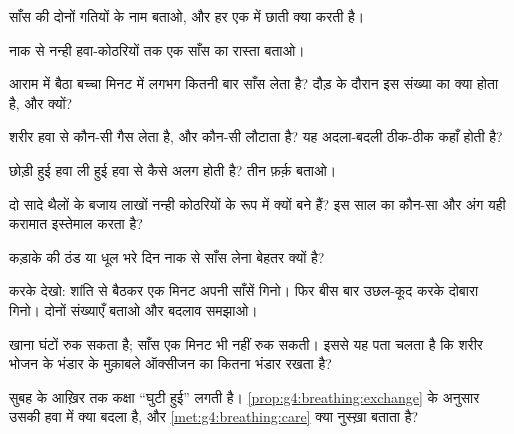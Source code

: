 \begin{exercise}[$\star$]\label{exo:g4:breathing:1}
साँस की दोनों गतियों के नाम बताओ, और हर एक में छाती क्या करती है।
\end{exercise}

\begin{exercise}[$\star$]\label{exo:g4:breathing:2}
नाक से नन्ही हवा-कोठरियों तक एक साँस का रास्ता बताओ।
\end{exercise}

\begin{exercise}[$\star$]\label{exo:g4:breathing:3}
आराम में बैठा बच्चा मिनट में लगभग कितनी बार साँस लेता है? दौड़ के दौरान
इस संख्या का क्या होता है, और क्यों?
\end{exercise}

\begin{exercise}[$\star$]\label{exo:g4:breathing:4}
शरीर हवा से कौन-सी गैस लेता है, और कौन-सी लौटाता है? यह अदला-बदली
ठीक-ठीक कहाँ होती है?
\end{exercise}

\begin{exercise}[$\star$]\label{exo:g4:breathing:5}
छोड़ी हुई हवा ली हुई हवा से कैसे अलग होती है? तीन फ़र्क़ बताओ।
\end{exercise}

\begin{exercise}[$\star$]\label{exo:g4:breathing:6}
 दो सादे थैलों के बजाय लाखों नन्ही कोठरियों के रूप में क्यों बने
हैं? इस साल का कौन-सा और अंग यही करामात इस्तेमाल करता है?
\end{exercise}

\begin{exercise}[$\star$]\label{exo:g4:breathing:7}
कड़ाके की ठंड या धूल भरे दिन नाक से साँस लेना बेहतर क्यों है?
\end{exercise}

\begin{exercise}[$\star$]\label{exo:g4:breathing:8}
करके देखो: शांति से बैठकर एक मिनट अपनी साँसें गिनो। फिर बीस बार
उछल-कूद करके दोबारा गिनो। दोनों संख्याएँ बताओ और बदलाव समझाओ।
\end{exercise}

\begin{exercise}[$\star\star$]\label{exo:g4:breathing:9}
खाना घंटों रुक सकता है; साँस एक मिनट भी नहीं रुक सकती। इससे यह पता
चलता है कि शरीर भोजन के भंडार के मुक़ाबले ऑक्सीजन का कितना भंडार रखता
है?
\end{exercise}

\begin{exercise}[$\star\star$]\label{exo:g4:breathing:10}
सुबह के आख़िर तक कक्षा ``घुटी हुई'' लगती है।
\cref{prop:g4:breathing:exchange} के अनुसार उसकी हवा में क्या बदला है,
और \cref{met:g4:breathing:care} क्या नुस्ख़ा बताता है?
\end{exercise}

